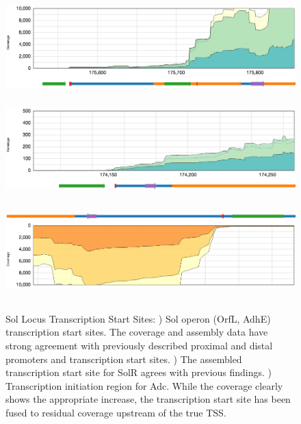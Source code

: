 \begin{figure}
\small
{\includegraphics[width=\textwidth,height=1.5in]{images/Assembly/Sol/Sol-TSS.png}
\label{fig:2a}}
{\includegraphics[width=\textwidth,height=1.5in]{images/Assembly/Sol/Sol-SolR-TSS.png}
\label{fig:2b}}
{\includegraphics[width=\textwidth,height=1.5in]{images/Assembly/Sol/Sol-Adc-TSS.png}
\label{fig:2c}}
\caption{Sol Locus Transcription Start Sites: ) Sol operon (OrfL, AdhE) transcription start sites. The coverage and assembly data have strong agreement with previously described proximal and distal promoters and transcription start sites. ) The assembled transcription start site for SolR agrees with previous findings. ) Transcription initiation region for Adc. While the coverage clearly shows the appropriate increase, the transcription start site has been fused to residual coverage upstream of the true TSS. }
\end{figure}
